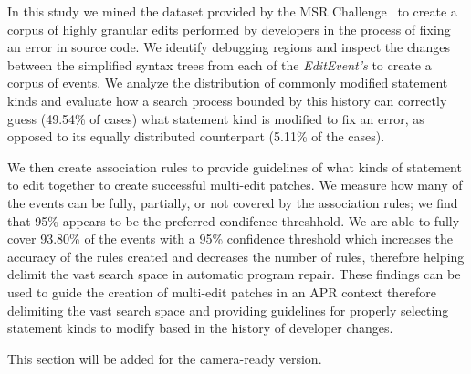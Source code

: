 \documentclass[sigconf]{acmart}
\begin{document}
In this study we mined the dataset provided by the MSR Challenge~\cite{msr18challenge}
to create a corpus of highly granular edits performed by developers in the process
of fixing an error in source code. We identify debugging
regions and inspect the changes between the simplified 
syntax trees from each
of the \textit{EditEvent's} to create a corpus of 
events.
We analyze the distribution of commonly modified statement kinds and evaluate
how a search process bounded by this history can correctly guess (49.54\% of 
cases) what statement kind is modified to fix an error, as opposed to its
equally distributed counterpart (5.11\% of the cases).

We then create association rules to provide guidelines of what kinds of
statement to edit together to create successful multi-edit patches. 
We measure how many of the events
can be fully, partially, or not covered by the association rules; we find that
95\% appears to be the preferred condifence threshhold.
We are able to fully cover 93.80\% of the events with a 95\% confidence threshold
which increases the accuracy of the rules created and decreases the 
number of rules, therefore helping delimit the vast search space 
in automatic program repair. These findings can be used to guide the 
creation of multi-edit patches in an APR context therefore delimiting
the vast search space and providing guidelines for properly selecting
statement kinds to modify based in the history of developer changes.




\begin{acks}
 This section will be added for the camera-ready version.

\end{acks}




\end{document}
